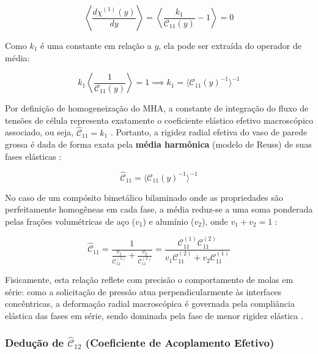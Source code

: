 \begin{equation}
  \left\langle \frac{d \chi^{(1)}(y)}{d y} \right\rangle = \left\langle \frac{k_1}{\mathcal{C}_{11}(y)} - 1 \right\rangle = 0
  \label{eq:mean_grad_chi1}
\end{equation}

Como $k_1$ é uma constante em relação a $y$, ela pode ser extraída do operador de média:

\begin{equation}
  k_1 \left\langle \frac{1}{\mathcal{C}_{11}(y)} \right\rangle = 1 \implies k_1 = \langle \mathcal{C}_{11}(y)^{-1} \rangle^{-1}
  \label{eq:k1_sol}
\end{equation}

Por definição de homogeneização do MHA, a constante de integração do fluxo de tensões de célula representa exatamente o coeficiente elástico efetivo macroscópico associado, ou seja, $\hat{\mathcal{C}}_{11} = k_1$ \cite{bakhvalov1989}. Portanto, a rigidez radial efetiva do vaso de parede grossa é dada de forma exata pela \textbf{média harmônica} (modelo de Reuss) de suas fases elásticas \cite{bakhvalov1989}:

\begin{equation}
  \hat{\mathcal{C}}_{11} = \langle \mathcal{C}_{11}(y)^{-1} \rangle^{-1}
  \label{eq:C11_eff_final}
\end{equation}

No caso de um compósito bimetálico bilaminado onde as propriedades são perfeitamente homogêneas em cada fase, a média reduz-se a uma soma ponderada pelas frações volumétricas de aço ($v_1$) e alumínio ($v_2$), onde $v_1 + v_2 = 1$ \cite{PartonReport}:

\begin{equation}
  \hat{\mathcal{C}}_{11} = \frac{1}{\frac{v_1}{\mathcal{C}_{11}^{(1)}} + \frac{v_2}{\mathcal{C}_{11}^{(2)}}} = \frac{\mathcal{C}_{11}^{(1)} \mathcal{C}_{11}^{(2)}}{v_1 \mathcal{C}_{11}^{(2)} + v_2 \mathcal{C}_{11}^{(1)}}
  \label{eq:C11_bilaminado}
\end{equation}

Fisicamente, esta relação reflete com precisão o comportamento de molas em série: como a solicitação de pressão atua perpendicularmente às interfaces concêntricas, a deformação radial macroscópica é governada pela compliância elástica das fases em série, sendo dominada pela fase de menor rigidez elástica \cite{PartonReport}.

\subsubsection{Dedução de $\hat{\mathcal{C}}_{12}$ (Coeficiente de Acoplamento Efetivo)}

